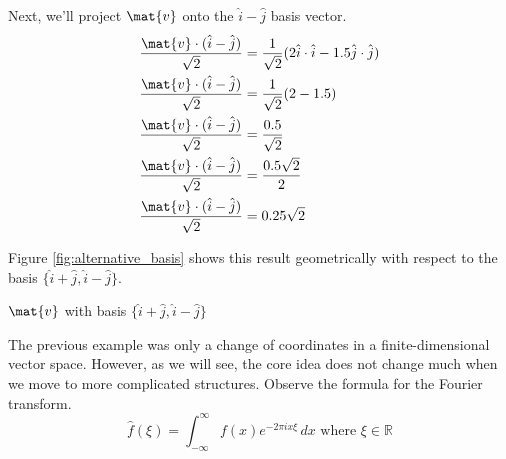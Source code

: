 Next, we'll project $\mat{v}$ onto the $\hat{i} - \hat{j}$ basis vector.
\begin{align*}
  \frac{\mat{v} \cdot (\hat{i} - \hat{j})}{\sqrt{2}} &=
    \frac{1}{\sqrt{2}} (2\hat{i} \cdot \hat{i} - 1.5\hat{j} \cdot \hat{j}) \\
  \frac{\mat{v} \cdot (\hat{i} - \hat{j})}{\sqrt{2}} &=
    \frac{1}{\sqrt{2}} (2 - 1.5) \\
  \frac{\mat{v} \cdot (\hat{i} - \hat{j})}{\sqrt{2}} &= \frac{0.5}{\sqrt{2}} \\
  \frac{\mat{v} \cdot (\hat{i} - \hat{j})}{\sqrt{2}} &= \frac{0.5\sqrt{2}}{2} \\
  \frac{\mat{v} \cdot (\hat{i} - \hat{j})}{\sqrt{2}} &= 0.25\sqrt{2}
\end{align*}

Figure \ref{fig:alternative_basis} shows this result geometrically with respect
to the basis $\{\hat{i} + \hat{j}, \hat{i} - \hat{j}\}$.
\begin{bookfigure}

  \caption{$\mat{v}$ with basis $\{\hat{i} + \hat{j}, \hat{i} - \hat{j}\}$}
  \label{fig:alternative_basis}
\end{bookfigure}

The previous example was only a change of coordinates in a finite-dimensional
vector space. However, as we will see, the core idea does not change much when
we move to more complicated structures. Observe the formula for the Fourier
transform.
\begin{equation*}
  \hat{f}(\xi) = \int_{-\infty}^\infty f(x) e^{-2\pi ix \xi} \,dx
    \text{ where } \xi \in \mathbb{R}
\end{equation*}


